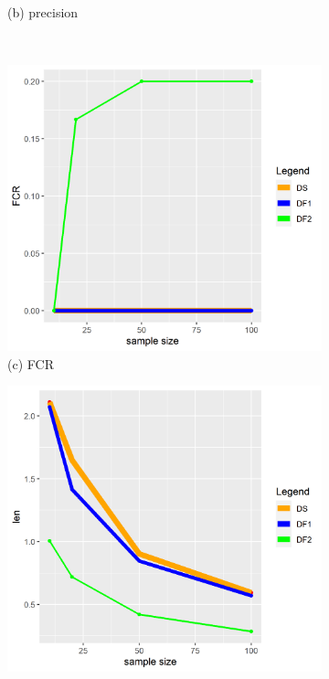 \begin{figure}[ht!]
\begin{subfigure}[b]{.32\columnwidth}
    \caption{(b) precision}
\end{subfigure}
\\
\centering
\begin{subfigure}[b]{.32\columnwidth} 
    \includegraphics[width=\columnwidth]{../../plot/FCR_1.png}
    \caption{(c) FCR}
\end{subfigure}
\hfill
\centering
\begin{subfigure}[b]{.32\columnwidth} 
    \includegraphics[width=\columnwidth]{../../plot/len_1.png}

\end{subfigure}
\end{figure}
